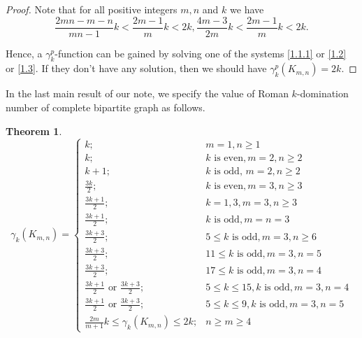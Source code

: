 \documentclass[12pt]{amsart}
\newtheorem{theorem}{Theorem}[section]
\begin{document}
\begin{proof}
Note that for all positive integers $m,n$ and $k$ we have
$$\frac{2mn-m-n}{mn-1}k<\frac{2m-1}{m}k<2k, \frac{4m-3}{2m}k<\frac{2m-1}{m}k<2k.$$


Hence, a $\gamma_k^p$-function can be gained by solving one of the systems \ref{1.1.1} or \ref{1.2} or \ref{1.3}. If they don't have any solution, then we should have $\gamma_k^p(K_{m,n})=2k$. 
\end{proof}

In the last main result of our note, we specify the value of Roman $k$-domination number of complete bipartite graph as follows.
\begin{theorem}\label{thm4}
$$\gamma_k(K_{m,n})=\left\lbrace \begin{array}{ll}
k; & m=1, n\geq 1 \\ 
k; & k \textrm{ is even}, m=2, n\geq 2 \\
k+1; &  k \textrm{ is odd, } m=2, n\geq 2 \\
\frac{3k}{2}; & k \textrm{ is even}, m=3, n\geq 3 \\
\frac{3k+1}{2}; & k=1,3 , m=3, n\geq 3 \\  
\frac{3k+1}{2}; & k \textrm{ is odd}, m=n=3 \\
\frac{3k+3}{2}; & 5\leq k \textrm{ is odd}, m=3, n\geq 6 \\
\frac{3k+3}{2}; & 11\leq k \textrm{ is odd}, m=3, n=5 \\
\frac{3k+3}{2}; & 17\leq k \textrm{ is odd}, m=3, n=4 \\
\frac{3k+1}{2} \textrm{ or } \frac{3k+3}{2}; & 5\leq k \leq 15, k \textrm{ is odd}, m=3, n=4 \\
\frac{3k+1}{2} \textrm{ or } \frac{3k+3}{2}; & 5\leq k \leq 9, k \textrm{ is odd}, m=3, n=5 \\
\frac{2m}{m+1}k \leq \gamma_k(K_{m,n})\leq 2k; & n\geq m\geq 4 
\end{array} \right.$$
\end{theorem}
\end{document}
